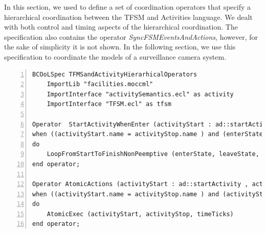 In this section, we used \bcool to define a set of coordination operators that specify a hierarchical coordination between the TFSM and Activities language. We dealt with both control and timing aspects of the hierarchical coordination. The specification also contains the operator \emph{SyncFSMEventsAndActions}, however, for the sake of simplicity it is not shown. In the following section, we use this specification to coordinate the models of a surveillance camera system.

\begin{lstlisting}[language=bcool,
caption={Timing and Hierarchical operator between TFSM and fUML languages},
label={lst:bcoolStartActivityWhenEnter}, 
basicstyle=\scriptsize\ttfamily, backgroundcolor=\color{LGrey}, numbers=left, xleftmargin=2pt]
BCOoLSpec TFMSandActivityHierarhicalOperators
	ImportLib "facilities.moccml"
	ImportInterface "activitySemantics.ecl" as activity
	ImportInterface "TFSM.ecl" as tfsm

Operator  StartActivityWhenEnter (activityStart : ad::startActivity , activityStop : ad::finishActivity, enterState : tfsm::entering, leaveState : tfsm::leaving)
when ((activityStart.name = activityStop.name ) and (enterState.name = leaveState.name) and (activityStart.name = enterState.onEnterAction.name));
do 
	LoopFromStartToFinishNonPeemptive (enterState, leaveState, activityStart, activityStop)
end operator;

Operator AtomicActions (activityStart : ad::startActivity , activityStop : ad::finishActivity, enterState : tfsm::entering, leaveState : tfsm::leaving, timeTicks : tfsm::ticks)
when ((activityStart.name = activityStop.name ) and (activityStart.name=enterState.OnEnterAction.name ) and (enterState.owningFSM.localClock = timeTicks));
do 
	AtomicExec (activityStart, activityStop, timeTicks)
end operator;
\end{lstlisting}



